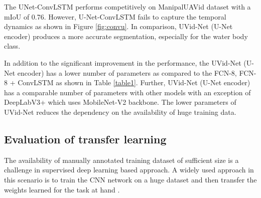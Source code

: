 \documentclass[journal]{IEEEtran}
\begin{document}
The UNet-ConvLSTM performs competitively on ManipalUAVid dataset with a mIoU of 0.76. 
However, U-Net-ConvLSTM fails to capture the temporal dynamics as shown in Figure \ref{fig:convu}.  In comparison, UVid-Net (U-Net encoder) produces a more accurate segmentation, especially for the water body class. 


In addition to the significant improvement in the performance, the UVid-Net (U-Net encoder) has a lower number of parameters as compared to the FCN-8, FCN-8 + ConvLSTM as shown in Table \ref{table1}. Further, UVid-Net (U-Net encoder) has a comparable number of parameters with other models with an exception of DeepLabV3+ which uses MobileNet-V2 backbone. The lower parameters of UVid-Net reduces the dependency on the availability of huge training data.


\subsection{Evaluation of transfer learning}
\par The availability of manually annotated training dataset of sufficient size is a challenge in supervised deep learning based approach. A widely used approach in this scenario is to train the CNN network on a huge dataset and then transfer the weights learned for the task at hand \cite{yosinski2014transferable}. 
\end{document}
